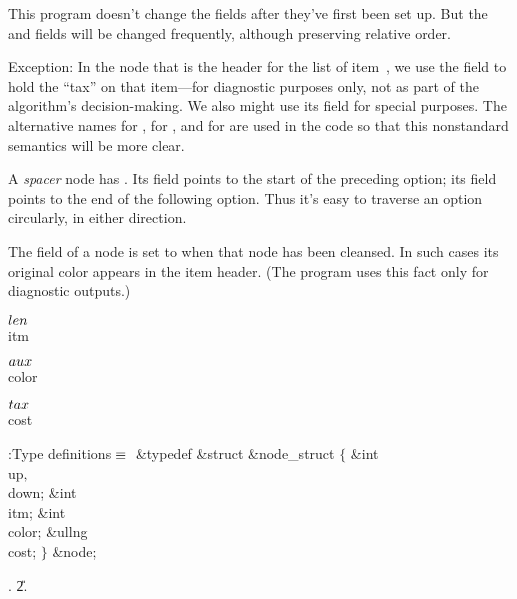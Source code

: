 This program doesn't change the  fields after they've first been
set up.
But the  and  fields will be changed frequently,
although preserving
relative order.

Exception: In the node  that is the header for the list of
item~, we use the  field to hold the ``tax'' on that
item---for
diagnostic purposes only, not as part of the algorithm's decision-making.
We also might use its  field for special purposes.
The alternative names  for ,  for , and  for 
are used in the code so that this nonstandard semantics will be more clear.

A {\it spacer\/} node has . Its  field points
to the start
of the preceding option; its  field points to the end of the
following option.
Thus it's easy to traverse an option circularly, in either direction.

The  field of a node is set to  when that node has
been cleansed.
In such cases its original color appears in the item header.
(The program uses this fact only for diagnostic outputs.)

\Y\B\4\D$\\{len}$ \5
\\{itm}\par
\B\4\D$\\{aux}$ \5
\\{color}\par
\B\4\D$\\{tax}$ \5
\\{cost}\par
\Y\B\4:Type definitions\X${}\equiv{}$\6
\&{typedef} \&{struct} \&{node\_struct} ${}\{{}$\1\6
\&{int} \\{up}${},{}$ \\{down};\6
\&{int} \\{itm};\6
\&{int} \\{color};\6
\&{ullng} \\{cost};\2\6
${}\}{}$ \&{node};\par
{}.
\U2.\fi

